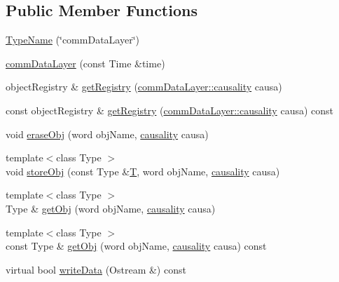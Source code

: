 \subsection*{Public Member Functions}
\begin{DoxyCompactItemize}
\item 
\hyperlink{classFoam_1_1commDataLayer_a37b7986dba64ce7a09cad34a11554799}{Type\+Name} (\char`\"{}comm\+Data\+Layer\char`\"{})
\item 
\hyperlink{classFoam_1_1commDataLayer_a5cdbf4f07cb204d71683132436303e9e}{comm\+Data\+Layer} (const Time \&time)
\item 
object\+Registry \& \hyperlink{classFoam_1_1commDataLayer_aa20cb9559f64cda8e2ed7c334bc63d31}{get\+Registry} (\hyperlink{classFoam_1_1commDataLayer_adf08957fc1cde455c7a03a53bf4d268c}{comm\+Data\+Layer\+::causality} causa)
\item 
const object\+Registry \& \hyperlink{classFoam_1_1commDataLayer_a57385c013402b5230f3bd52bc8f79614}{get\+Registry} (\hyperlink{classFoam_1_1commDataLayer_adf08957fc1cde455c7a03a53bf4d268c}{comm\+Data\+Layer\+::causality} causa) const
\item 
void \hyperlink{classFoam_1_1commDataLayer_a4e51054ae140086903cbe3e1f7208c5f}{erase\+Obj} (word obj\+Name, \hyperlink{classFoam_1_1commDataLayer_adf08957fc1cde455c7a03a53bf4d268c}{causality} causa)
\item 
{\footnotesize template$<$class Type $>$ }\\void \hyperlink{classFoam_1_1commDataLayer_afd617704e268ece5ad93ce6bd286aeda}{store\+Obj} (const Type \&\hyperlink{EEqn__1pl_8H_ad0f94aa7ea43d4be0bae24e3a89aad0c}{T}, word obj\+Name, \hyperlink{classFoam_1_1commDataLayer_adf08957fc1cde455c7a03a53bf4d268c}{causality} causa)
\item 
{\footnotesize template$<$class Type $>$ }\\Type \& \hyperlink{classFoam_1_1commDataLayer_a6ebe4254f843b45792f7e070b44faab6}{get\+Obj} (word obj\+Name, \hyperlink{classFoam_1_1commDataLayer_adf08957fc1cde455c7a03a53bf4d268c}{causality} causa)
\item 
{\footnotesize template$<$class Type $>$ }\\const Type \& \hyperlink{classFoam_1_1commDataLayer_a63be53025e469bed9c2dd807ce4461af}{get\+Obj} (word obj\+Name, \hyperlink{classFoam_1_1commDataLayer_adf08957fc1cde455c7a03a53bf4d268c}{causality} causa) const
\item 
virtual bool \hyperlink{classFoam_1_1commDataLayer_ab51c6051806556654dc16796bf37619a}{write\+Data} (Ostream \&) const
\end{DoxyCompactItemize}
